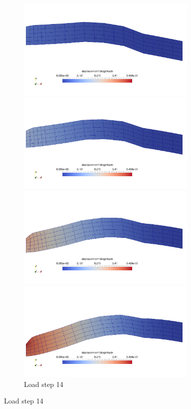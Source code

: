 \documentclass[11pt,a4paper,final]{article}
\begin{document}
\begin{figure}[ht!]
\centering
\begin{subfigure}[b]{0.49\textwidth}
\centering
\includegraphics[width=0.95\textwidth]{hooped_ls_4.png}
\caption{Load step 4}
\centering
\includegraphics[width=0.95\textwidth]{hooped_ls_9.png}
\caption{Load step 9}
\centering
\includegraphics[width=0.95\textwidth]{hooped_ls_14.png}
\caption{Load step 14}
\centering
\includegraphics[width=0.95\textwidth]{hooped_ls_19.png}

\end{subfigure}
\end{figure}
\end{document}
